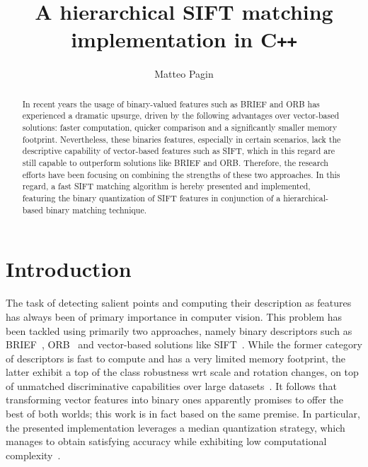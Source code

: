 \documentclass[a4paper, 11pt, oneside]{article}
\date{}
\begin{document}
\title{\vspace{-1.0cm}\huge \textbf{A hierarchical SIFT matching \\ implementation in C\texttt{++}} }
\author[1]{\Large Matteo Pagin}

\maketitle

\thispagestyle{empty}

\begin{abstract}
	In recent years the usage of binary-valued features such as BRIEF and ORB has experienced a dramatic upsurge, driven by the following advantages over vector-based solutions: faster computation, quicker comparison and a significantly smaller memory footprint. Nevertheless, these binaries features, especially in certain scenarios, lack the descriptive capability of vector-based features such as SIFT, which in this regard are still capable to outperform solutions like BRIEF and ORB. Therefore, the research efforts have been focusing on combining the strengths of these two approaches. In this regard, a fast SIFT matching algorithm is hereby presented and implemented, featuring the binary quantization of SIFT features in conjunction of a hierarchical-based binary matching technique.
\end{abstract}

\section*{Introduction}
  The task of detecting salient points and computing their description as features has always been of primary importance in computer vision. This problem has been tackled using primarily two approaches, namely binary descriptors such as BRIEF~\cite{calonder2010brief}, ORB~\cite{rublee2011orb} and vector-based solutions like SIFT~\cite{lowe2004distinctive}. While the former category of descriptors is fast to compute and has a very limited memory footprint, the latter exhibit a top of the class robustness wrt scale and rotation changes, on top of unmatched discriminative capabilities over large datasets~\cite{grauman2005efficient, karami2017image}. It follows that transforming vector features into binary ones apparently promises to offer the best of both worlds; this work is in fact based on the same premise. In particular, the presented implementation leverages a median quantization strategy, which manages to obtain satisfying accuracy while exhibiting low computational complexity~\cite{peker2011binary}.
  
\end{document}
